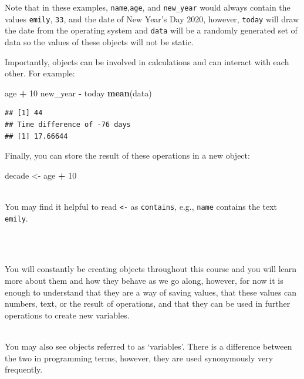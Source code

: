 \documentclass[]{book}
\newenvironment{Shaded}{\begin{snugshade}}{\end{snugshade}}
\newcommand{\DecValTok}[1]{\textcolor[rgb]{0.00,0.00,0.81}{#1}}
\newcommand{\KeywordTok}[1]{\textcolor[rgb]{0.13,0.29,0.53}{\textbf{#1}}}
\newcommand{\NormalTok}[1]{#1}
\newcommand{\OperatorTok}[1]{\textcolor[rgb]{0.81,0.36,0.00}{\textbf{#1}}}
\newcommand{\StringTok}[1]{\textcolor[rgb]{0.31,0.60,0.02}{#1}}
\newenvironment{info}
    {
    \hline\\
    }
    { 
    \\\\\hline
    }
\newenvironment{try}
    {
    \hline\\
    }
    { 
    \\\\\hline
    }
\begin{document}
Note that in these examples, \texttt{name},\texttt{age}, and \texttt{new\_year} would always contain the values \texttt{emily}, \texttt{33}, and the date of New Year's Day 2020, however, \texttt{today} will draw the date from the operating system and \texttt{data} will be a randomly generated set of data so the values of these objects will not be static.

Importantly, objects can be involved in calculations and can interact with each other. For example:

\begin{Shaded}
\begin{Highlighting}[]
\NormalTok{age }\OperatorTok{+}\StringTok{ }\DecValTok{10}
\NormalTok{new_year }\OperatorTok{-}\StringTok{ }\NormalTok{today}
\KeywordTok{mean}\NormalTok{(data)}
\end{Highlighting}
\end{Shaded}

\begin{verbatim}
## [1] 44
## Time difference of -76 days
## [1] 17.66644
\end{verbatim}

Finally, you can store the result of these operations in a new object:

\begin{Shaded}
\begin{Highlighting}[]
\NormalTok{decade <-}\StringTok{ }\NormalTok{age }\OperatorTok{+}\StringTok{ }\DecValTok{10}
\end{Highlighting}
\end{Shaded}

\begin{try}
You may find it helpful to read \texttt{\textless{}-} as
\texttt{contains}, e.g., \texttt{name} contains the text \texttt{emily}.
\end{try}

You will constantly be creating objects throughout this course and you will learn more about them and how they behave as we go along, however, for now it is enough to understand that they are a way of saving values, that these values can numbers, text, or the result of operations, and that they can be used in further operations to create new variables.

\begin{info}
You may also see objects referred to as `variables'. There is a
difference between the two in programming terms, however, they are used
synonymously very frequently.
\end{info}
\end{document}
